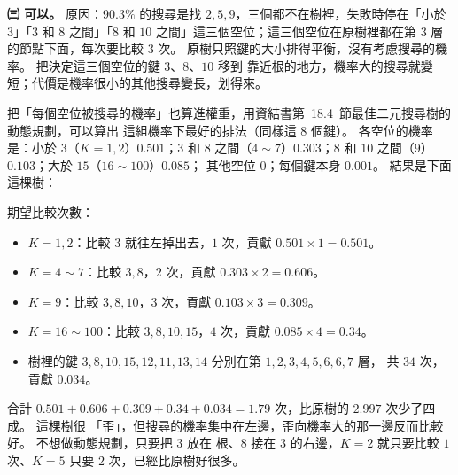 \begin{pastsoln}
\textbf{㈢ 可以。} 原因：$90.3\%$ 的搜尋是找 $2, 5, 9$，三個都不在樹裡，失敗時停在「小於 $3$」「$3$ 和
$8$ 之間」「$8$ 和 $10$ 之間」這三個空位；這三個空位在原樹裡都在第 $3$ 層的節點下面，每次要比較
$3$ 次。 原樹只照鍵的大小排得平衡，沒有考慮搜尋的機率。 把決定這三個空位的鍵 $3$、$8$、$10$ 移到
靠近根的地方，機率大的搜尋就變短；代價是機率很小的其他搜尋變長，划得來。

把「每個空位被搜尋的機率」也算進權重，用資結書第~18.4~節最佳二元搜尋樹的動態規劃，可以算出
這組機率下最好的排法（同樣這 $8$ 個鍵）。 各空位的機率是：小於 $3$（$K = 1, 2$）$0.501$；$3$ 和
$8$ 之間（$4 \sim 7$）$0.303$；$8$ 和 $10$ 之間（$9$）$0.103$；大於 $15$（$16 \sim 100$）$0.085$；
其他空位 $0$；每個鍵本身 $0.001$。 結果是下面這棵樹：
\begin{center}
\end{center}
期望比較次數：
\begin{itemize}
\item $K = 1, 2$：比較 $3$ 就往左掉出去，$1$ 次，貢獻 $0.501 \times 1 = 0.501$。
\item $K = 4 \sim 7$：比較 $3, 8$，$2$ 次，貢獻 $0.303 \times 2 = 0.606$。
\item $K = 9$：比較 $3, 8, 10$，$3$ 次，貢獻 $0.103 \times 3 = 0.309$。
\item $K = 16 \sim 100$：比較 $3, 8, 10, 15$，$4$ 次，貢獻 $0.085 \times 4 = 0.34$。
\item 樹裡的鍵 $3, 8, 10, 15, 12, 11, 13, 14$ 分別在第 $1, 2, 3, 4, 5, 6, 6, 7$ 層，
共 $34$ 次，貢獻 $0.034$。
\end{itemize}
合計 $0.501 + 0.606 + 0.309 + 0.34 + 0.034 = 1.79$ 次，比原樹的 $2.997$ 次少了四成。 這棵樹很
「歪」，但搜尋的機率集中在左邊，歪向機率大的那一邊反而比較好。 不想做動態規劃，只要把 $3$ 放在
根、$8$ 接在 $3$ 的右邊，$K = 2$ 就只要比較 $1$ 次、$K = 5$ 只要 $2$ 次，已經比原樹好很多。
\end{pastsoln}
